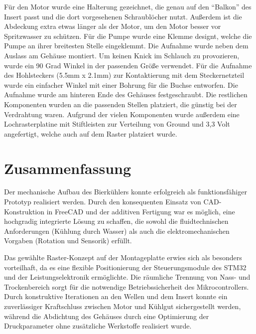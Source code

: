 Für den Motor wurde eine Halterung gezeichnet, die genau auf den “Balkon” des Insert passt und die dort vorgesehenen Schraublöcher nutzt. Außerdem ist die Abdeckung extra etwas länger als der Motor, um den Motor besser vor Spritzwasser zu schützen. Für die Pumpe wurde eine Klemme designt, welche die Pumpe an ihrer breitesten Stelle eingeklemmt. Die Aufnahme wurde neben dem Auslass am Gehäuse montiert. Um keinen Knick im Schlauch zu provozieren, wurde ein 90 Grad Winkel in der passenden Größe verwendet. Für die Aufnahme des Hohlsteckers (5.5mm x 2.1mm) zur Kontaktierung mit dem Steckernetzteil wurde ein einfacher Winkel mit einer Bohrung für die Buchse entworfen. Die Aufnahme wurde am hinteren Ende des Gehäuses festgeschraubt. Die restlichen Komponenten wurden an die passenden Stellen platziert, die günstig bei der Verdrahtung waren. Aufgrund der vielen Komponenten wurde außerdem eine Lochrasterplatine mit Stiftleisten zur Verteilung von Ground und 3,3 Volt angefertigt, welche auch auf dem Raster platziert wurde.

\section{Zusammenfassung}

Der mechanische Aufbau des Bierkühlers konnte erfolgreich als funktionsfähiger Prototyp realisiert werden. Durch den konsequenten Einsatz von CAD-Konstruktion in FreeCAD und der additiven Fertigung war es möglich, eine hochgradig integrierte Lösung zu schaffen, die sowohl die fluidtechnischen Anforderungen (Kühlung durch Wasser) als auch die elektromechanischen Vorgaben (Rotation und Sensorik) erfüllt.

Das gewählte Raster-Konzept auf der Montageplatte erwies sich als besonders vorteilhaft, da es eine flexible Positionierung der Steuerungsmodule des STM32 und der Leistungselektronik ermöglichte. Die räumliche Trennung von Nass- und Trockenbereich sorgt für die notwendige Betriebssicherheit des Mikrocontrollers. Durch konstruktive Iterationen an den Wellen und dem Insert konnte ein zuverlässiger Kraftschluss zwischen Motor und Kühlgut sichergestellt werden, während die Abdichtung des Gehäuses durch eine Optimierung der Druckparameter ohne zusätzliche Werkstoffe realisiert wurde.

